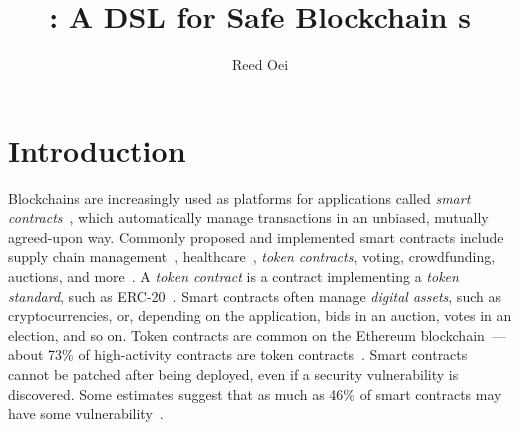 \documentclass[dvipsnames,runningheads]{llncs}
\begin{document}
\title{\langName: A DSL for Safe Blockchain \AssetTxt{}s}

\author{Reed Oei}

\maketitle

\begin{abstract}
\end{abstract}

\section{Introduction}

Blockchains are increasingly used as platforms for applications called \emph{smart contracts}~\cite{Szabo97:Formalizing}, which automatically manage transactions in an unbiased, mutually agreed-upon way.
Commonly proposed and implemented smart contracts include supply chain management~\cite{SupplyChainUse}, healthcare~\cite{HealthcareUse}, \emph{token contracts}, voting, crowdfunding, auctions, and more~\cite{Elsden18:Making}.
A \emph{token contract} is a contract implementing a \emph{token standard}, such as ERC-20~\cite{erc20}.
Smart contracts often manage \emph{digital assets}, such as cryptocurrencies, or, depending on the application, bids in an auction, votes in an election, and so on.
Token contracts are common on the Ethereum blockchain~\cite{wood2014ethereum}---about 73\% of high-activity contracts are token contracts~\cite{OlivaEtAl2019}.
Smart contracts cannot be patched after being deployed, even if a security vulnerability is discovered.
Some estimates suggest that as much as 46\% of smart contracts may have some vulnerability~\cite{luuOyente}.
\end{document}

